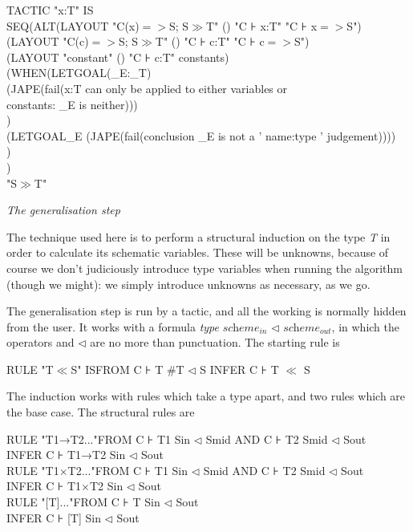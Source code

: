 TACTIC "x:T" IS\\
\tab SEQ\tab (ALT\tab (LAYOUT "C(x)$=>$S; S$\gg$T" () "C ⊦ x:T" "C ⊦ x$=>$S") \\
\tab \tab \tab (LAYOUT "C(c)$=>$S; S$\gg$T" () "C ⊦ c:T" "C ⊦ c$=>$S")\\
\tab \tab \tab (LAYOUT "constant" () "C ⊦ c:T" constants)\\
\tab \tab \tab (WHEN\tab (LETGOAL\tab (\_E:\_T)\\
\tab \tab \tab \tab \tab (JAPE(fail(x:T can only be applied to either variables or\\
\tab \tab \tab \tab \tab \tab \tab constants: \_E is neither)))\\
\tab \tab \tab \tab )\\
\tab \tab \tab \tab (LETGOAL\tab \_E (JAPE(fail(conclusion \_E is not a ' name:type ' judgement))))\\
\tab \tab \tab )\\
\tab \tab ) \\
\tab \tab "S$\gg$T"


\textit{The generalisation step}


The technique used here is to perform a structural induction on the type \textit{T} in order to calculate its schematic variables. These will be unknowns, because of course we don't judiciously introduce type variables when running the algorithm (though we might): we simply introduce unknowns as necessary, as we go.


The generalisation step is run by a tactic, and all the working is normally hidden from the user. It works with a formula \textit{type} {\textbullet} $\textit{scheme}_{\textit{in}}$ $\triangleleft$ $\textit{scheme}_{\textit{out}}$, in which the operators {\textbullet} and $\triangleleft$ are no more than punctuation. The starting rule is

RULE "T$\ll$S" IS\tab FROM C ⊦ T {\textbullet} \#T $\triangleleft$ S \tab INFER C ⊦ T $\ll$ S


The induction works with rules which take a type apart, and two rules which are the base case. The structural rules are

RULE "T1→T2{\textbullet}..."\tab FROM C ⊦ T1{\textbullet} Sin $\triangleleft$ Smid AND C ⊦ T2 {\textbullet} Smid $\triangleleft$ Sout\\
\tab \tab INFER C ⊦ T1→T2 {\textbullet} Sin $\triangleleft$ Sout\\
RULE "T1$\times$T2{\textbullet}..."\tab FROM C ⊦ T1{\textbullet} Sin $\triangleleft$ Smid AND C ⊦ T2 {\textbullet} Smid $\triangleleft$ Sout\\
\tab \tab INFER C ⊦ T1$\times$T2 {\textbullet} Sin $\triangleleft$ Sout\\
RULE "[T]{\textbullet}..."\tab FROM C ⊦ T {\textbullet} Sin $\triangleleft$ Sout\\
\tab \tab INFER C ⊦ [T] {\textbullet} Sin $\triangleleft$ Sout


